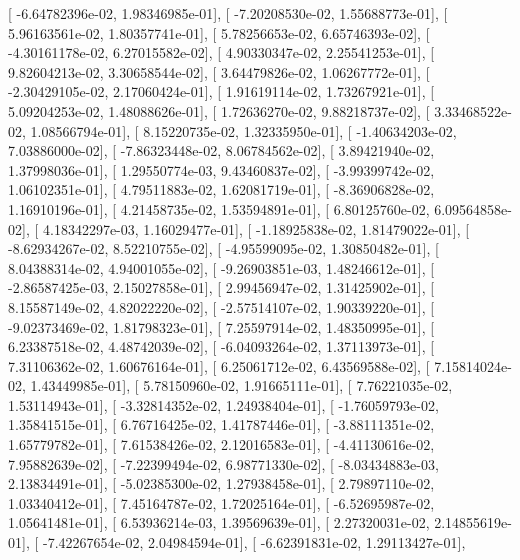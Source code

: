 \documentclass{article}
\begin{document}
       [ -6.64782396e-02,   1.98346985e-01],
       [ -7.20208530e-02,   1.55688773e-01],
       [  5.96163561e-02,   1.80357741e-01],
       [  5.78256653e-02,   6.65746393e-02],
       [ -4.30161178e-02,   6.27015582e-02],
       [  4.90330347e-02,   2.25541253e-01],
       [  9.82604213e-02,   3.30658544e-02],
       [  3.64479826e-02,   1.06267772e-01],
       [ -2.30429105e-02,   2.17060424e-01],
       [  1.91619114e-02,   1.73267921e-01],
       [  5.09204253e-02,   1.48088626e-01],
       [  1.72636270e-02,   9.88218737e-02],
       [  3.33468522e-02,   1.08566794e-01],
       [  8.15220735e-02,   1.32335950e-01],
       [ -1.40634203e-02,   7.03886000e-02],
       [ -7.86323448e-02,   8.06784562e-02],
       [  3.89421940e-02,   1.37998036e-01],
       [  1.29550774e-03,   9.43460837e-02],
       [ -3.99399742e-02,   1.06102351e-01],
       [  4.79511883e-02,   1.62081719e-01],
       [ -8.36906828e-02,   1.16910196e-01],
       [  4.21458735e-02,   1.53594891e-01],
       [  6.80125760e-02,   6.09564858e-02],
       [  4.18342297e-03,   1.16029477e-01],
       [ -1.18925838e-02,   1.81479022e-01],
       [ -8.62934267e-02,   8.52210755e-02],
       [ -4.95599095e-02,   1.30850482e-01],
       [  8.04388314e-02,   4.94001055e-02],
       [ -9.26903851e-03,   1.48246612e-01],
       [ -2.86587425e-03,   2.15027858e-01],
       [  2.99456947e-02,   1.31425902e-01],
       [  8.15587149e-02,   4.82022220e-02],
       [ -2.57514107e-02,   1.90339220e-01],
       [ -9.02373469e-02,   1.81798323e-01],
       [  7.25597914e-02,   1.48350995e-01],
       [  6.23387518e-02,   4.48742039e-02],
       [ -6.04093264e-02,   1.37113973e-01],
       [  7.31106362e-02,   1.60676164e-01],
       [  6.25061712e-02,   6.43569588e-02],
       [  7.15814024e-02,   1.43449985e-01],
       [  5.78150960e-02,   1.91665111e-01],
       [  7.76221035e-02,   1.53114943e-01],
       [ -3.32814352e-02,   1.24938404e-01],
       [ -1.76059793e-02,   1.35841515e-01],
       [  6.76716425e-02,   1.41787446e-01],
       [ -3.88111351e-02,   1.65779782e-01],
       [  7.61538426e-02,   2.12016583e-01],
       [ -4.41130616e-02,   7.95882639e-02],
       [ -7.22399494e-02,   6.98771330e-02],
       [ -8.03434883e-03,   2.13834491e-01],
       [ -5.02385300e-02,   1.27938458e-01],
       [  2.79897110e-02,   1.03340412e-01],
       [  7.45164787e-02,   1.72025164e-01],
       [ -6.52695987e-02,   1.05641481e-01],
       [  6.53936214e-03,   1.39569639e-01],
       [  2.27320031e-02,   2.14855619e-01],
       [ -7.42267654e-02,   2.04984594e-01],
       [ -6.62391831e-02,   1.29113427e-01],
\end{document}
